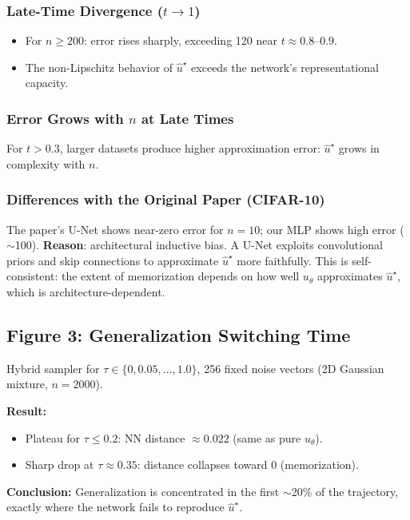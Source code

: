 \documentclass[11pt, a4paper]{article}
\theoremstyle{plain}
\theoremstyle{definition}
\theoremstyle{remark}
\begin{document}
\subsubsection{Late-Time Divergence ($t \to 1$)}
\begin{itemize}
  \item For $n \geq 200$: error rises sharply, exceeding 120 near $t \approx 0.8$--$0.9$.
  \item The non-Lipschitz behavior of $\hat{u}^\star$ exceeds the network's representational capacity.
\end{itemize}

\subsubsection{Error Grows with $n$ at Late Times}
For $t > 0.3$, larger datasets produce higher approximation error: $\hat{u}^\star$ grows in complexity with $n$.

\subsubsection{Differences with the Original Paper (CIFAR-10)}
The paper's U-Net shows near-zero error for $n=10$; our MLP shows high error ($\sim$100). \textbf{Reason}: architectural inductive bias. A U-Net exploits convolutional priors and skip connections to approximate $\hat{u}^\star$ more faithfully. This is self-consistent: the extent of memorization depends on how well $u_\theta$ approximates $\hat{u}^\star$, which is architecture-dependent.

\subsection{Figure 3: Generalization Switching Time}

Hybrid sampler for $\tau \in \{0, 0.05, \ldots, 1.0\}$, 256 fixed noise vectors (2D Gaussian mixture, $n=2000$).

\textbf{Result:}
\begin{itemize}
  \item Plateau for $\tau \leq 0.2$: NN distance $\approx 0.022$ (same as pure $u_\theta$).
  \item Sharp drop at $\tau \approx 0.35$: distance collapses toward 0 (memorization).
\end{itemize}

\textbf{Conclusion:} Generalization is concentrated in the first $\sim$20\% of the trajectory, exactly where the network fails to reproduce $\hat{u}^\star$.
\end{document}
